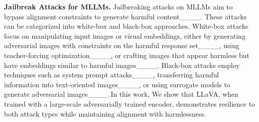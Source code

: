 
\noindent \textbf{Jailbreak Attacks for MLLMs.} Jailbreaking attacks on MLLMs aim to bypass alignment constraints to generate harmful content____. These attacks can be categorized into white-box and black-box approaches. White-box attacks focus on manipulating input images or visual embeddings, either by generating adversarial images with constraints on the harmful response set____, using teacher-forcing optimization____, or crafting images that appear harmless but have embeddings similar to harmful images____. Black-box attacks employ techniques such as system prompt attacks____, transferring harmful information into text-oriented images____, or using surrogate models to generate adversarial images____.In this work, We show that LLaVA, when trained with a large-scale adversarially trained encoder, demonstrates resilience to both attack types while maintaining alignment with harmlessness.